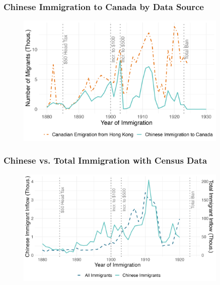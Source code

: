 \documentclass[xcolor=dvipsnames, compress, 12pt, aspectratio=169, handout]{beamer}
\begin{document}
\begin{frame}
    \label{figa2_imm}
    \frametitle{Chinese Immigration to Canada by Data Source \hyperlink{data}{}}
    \centering
    \begin{figure}
        \includegraphics[width = 0.9\textwidth]{../../figs/slides/fig2_flow_immandem.png}
    \end{figure}
\end{frame}

\begin{frame}
    \label{fig1_census}
    \frametitle{Chinese vs. Total Immigration with Census Data \hyperlink{fig1_main}{}}
    \centering
    \begin{figure}
        \includegraphics[width = 0.9\textwidth]{../../figs/slides/fig2_census_flow.png}
    \end{figure}
\end{frame}
\end{document}
